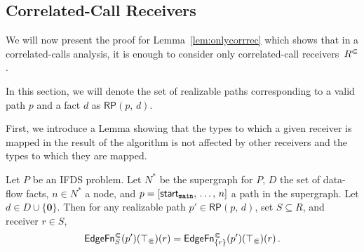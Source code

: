 \subsection*{Correlated-Call Receivers}
We will now present the proof for Lemma~\ref{lem:onlycorrrec} which shows that in a correlated-calls analysis, it is enough to consider only correlated-call receivers~${R^\Subset}$.

In this section, we will denote the set of realizable paths corresponding to a valid path $p$ and a fact $d$ as $\textsf{RP}(p,\,d)$.

First, we introduce a Lemma showing that the types to which a given receiver is mapped in the result of the algorithm is not affected by other receivers and the types to which they are mapped.

\begin{lemma}\label{lem:recindepedgefn}
  Let $P$ be an IFDS problem. Let $N^*$ be the supergraph for $P$, $D$ the set of data-flow facts, $n\in N^*$ a node, and $p=[\textsf{start}_\texttt{main},\,\dots,\,n]$ a path in the supergraph. Let $d\in D\cup\{\mathbf0\}$.
  Then for any realizable path $p'\in\textsf{RP}(p,\,d)$, set $S\subseteq R$, and receiver $r\in S$,
  \begin{equation}
    \textsf{EdgeFn}^\Subset_{S}(p')(\top_\Subset)(r)=
    \textsf{EdgeFn}^\Subset_{\{r\}}(p')(\top_\Subset)(r)\,.
  \end{equation}
\end{lemma}
